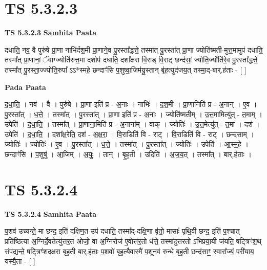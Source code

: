 \documentclass[17pt]{extarticle}
\begin{document}

\section{ TS 5.3.2.3 }

\textbf{TS 5.3.2.3 } \newline
\textbf{Samhita Paata} \newline

दधाति॒ नव॒ वै पुरु॑षे प्रा॒णा नाभि॑र्दश॒मी प्रा॒णाने॒व पु॒रस्ता᳚द्धत्ते॒ तस्मा᳚त् पु॒रस्ता᳚त् प्रा॒णा ज्योति॑ष्मती-मुत्त॒मामुप॑ दधाति॒ तस्मा᳚त् प्रा॒णानां॒ ॅवाग्ज्योति॑रुत्त॒मा दशोप॑ दधाति॒ दशा᳚क्षरा वि॒राड् वि॒राट् छन्द॑सां॒ ज्योति॒र्ज्योति॑रे॒व पु॒रस्ता᳚द्धत्ते॒ तस्मा᳚त् पु॒रस्ता॒ज्ज्योति॒रुपा᳚ ऽऽ*स्महे॒ छन्दाꣳ॑सि प॒शुष्वा॒जिम॑यु॒स्तान् बृ॑ह॒त्युद॑जय॒त् तस्मा॒द्-बार्.ह॑ताः - [  ] \newline

\textbf{Pada Paata} \newline

द॒धा॒ति॒ । नव॑ । वै । पुरु॑षे । प्रा॒णा इति॑ प्र - अ॒नाः । नाभिः॑ । द॒श॒मी । प्रा॒णानिति॑ प्र - अ॒नान् । ए॒व । पु॒रस्ता᳚त् । ध॒त्ते॒ । तस्मा᳚त् । पु॒रस्ता᳚त् । प्रा॒णा इति॑ प्र - अ॒नाः । ज्योति॑ष्मतीम् । उ॒त्त॒मामित्यु॑त् - त॒माम् । उपेति॑ । द॒धा॒ति॒ । तस्मा᳚त् । प्रा॒णाना॒मिति॑ प्र - अ॒नाना᳚म् । वाक् । ज्योतिः॑ । उ॒त्त॒मेत्यु॑त् - त॒मा । दश॑ । उपेति॑ । द॒धा॒ति॒ । दशा᳚क्ष॒रेति॒ दश॑ - अ॒क्ष॒रा॒ । वि॒राडिति॑ वि - राट् । वि॒राडिति॑ वि - राट् । छन्द॑साम् । ज्योतिः॑ । ज्योतिः॑ । ए॒व । पु॒रस्ता᳚त् । ध॒त्ते॒ । तस्मा᳚त् । पु॒रस्ता᳚त् । ज्योतिः॑ । उपेति॑ । आ॒स्म॒हे॒ । छन्दाꣳ॑सि । प॒शुषु॑ । आ॒जिम् । अ॒युः॒ । तान् । बृ॒ह॒ती । उदिति॑ । अ॒ज॒य॒त् । तस्मा᳚त् । बार्.ह॑ताः ।  \newline





\section{ TS 5.3.2.4 }

\textbf{TS 5.3.2.4 } \newline
\textbf{Samhita Paata} \newline

प॒शव॑ उच्यन्ते॒ मा छन्द॒ इति॑ दक्षिण॒त उप॑ दधाति॒ तस्मा᳚द्-दक्षि॒णा वृ॑तो॒ मासाः᳚ पृथि॒वी छन्द॒ इति॑ प॒श्चात् प्रति॑ष्ठित्या अ॒ग्निर्दे॒वतेत्यु॑त्तर॒त ओजो॒ वा अ॒ग्निरोज॑ ए॒वोत्त॑र॒तो ध॑त्ते॒ तस्मा॑दुत्तरतो ऽभिप्रया॒यी ज॑यति॒ षट्त्रिꣳ॑श॒थ् संप॑द्यन्ते॒ षट्त्रिꣳ॑शदक्षरा बृह॒ती बार्.ह॑ताः प॒शवो॑ बृह॒त्यैवास्मै॑ प॒शूनव॑ रुन्धे बृह॒ती छन्द॑साꣳ॒॒ स्वारा᳚ज्यं॒ परी॑याय॒ यस्यै॒ता - [  ] \newline
\end{document}
